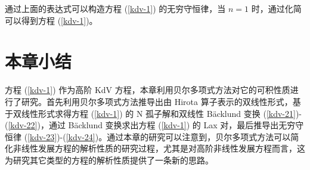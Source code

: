 通过上面的表达式可以构造方程 (\ref{kdv-1}) 的无穷守恒律，当 $n=1$ 时，通过化简可以得到方程 (\ref{kdv-1})。
\section{本章小结}
方程 (\ref{kdv-1}) 作为高阶 KdV 方程，本章利用贝尔多项式方法对它的可积性质进行了研究。首先利用贝尔多项式方法推导出由 Hirota 算子表示的双线性形式，基于双线性形式求得方程 (\ref{kdv-1}) 的 N 孤子解和双线性 B\"{a}cklund 变换 (\ref{kdv-21})-(\ref{kdv-22})，通过 B\"{a}cklund 变换求出方程 (\ref{kdv-1}) 的 Lax 对，最后推导出无穷守恒律 (\ref{kdv-23})-(\ref{kdv-24})。通过本章的研究可以注意到，贝尔多项式方法可以简化非线性发展方程的解析性质的研究过程，尤其是对高阶非线性发展方程而言，这为研究其它类型的方程的解析性质提供了一条新的思路。



